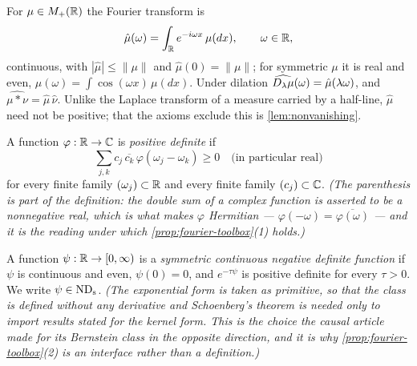 For $\mu \in M_+(\mathbb{R})$ the Fourier transform is
\begin{equation}\label{eq:transform}
  \hat\mu(\omega) = \int_{\mathbb{R}} e^{-i\omega x}\,\mu(dx), \qquad \omega \in \mathbb{R},
\end{equation}
continuous, with $|\hat\mu| \le \|\mu\|$ and $\hat\mu(0) = \|\mu\|$; for symmetric $\mu$ it is
real and even, $\hat\mu(\omega) = \int \cos(\omega x)\,\mu(dx)$. Under dilation
$\widehat{D_{\lambda}\mu}(\omega) = \hat\mu(\lambda\omega)$, and
$\widehat{\mu * \nu} = \hat\mu\,\hat\nu$. Unlike the Laplace transform of a measure carried by
a half-line, $\hat\mu$ need not be positive; that the axioms exclude this is
\ref{lem:nonvanishing}.

\begin{definition}\label{def:positive-definite}
\leanok
{}
A function $\varphi : \mathbb{R} \to \mathbb{C}$ is \emph{positive definite} if
\[
  \sum_{j,k} c_j\,\overline{c_k}\,\varphi(\omega_j - \omega_k) \ge 0
  \quad\text{(in particular real)}
\]
for every finite family $(\omega_j) \subset \mathbb{R}$ and every finite family $(c_j) \subset \mathbb{C}$.
\statusT\quad\emph{(The parenthesis is part of the definition: the double sum of a complex
function is asserted to be a nonnegative real, which is what makes $\varphi$ Hermitian ---
$\varphi(-\omega) = \overline{\varphi(\omega)}$ --- and it is the reading under which
\ref{prop:fourier-toolbox}(1) holds.)}
\end{definition}

\begin{definition}\label{def:symmetric-negdef}
\leanok
{}
A function $\psi : \mathbb{R} \to [0,\infty)$ is a \emph{symmetric continuous negative definite
function} if $\psi$ is continuous and even, $\psi(0) = 0$, and $e^{-\tau\psi}$ is positive
definite for every $\tau > 0$. We write $\psi \in \mathrm{ND}_{\mathrm{s}}$.
\statusT\quad\emph{(The exponential form is taken as primitive, so that the class is defined
without any derivative and Schoenberg's theorem is needed only to import results stated for
the kernel form. This is the choice the causal article made for its Bernstein class in the
opposite direction, and it is why \ref{prop:fourier-toolbox}(2) is an interface rather than a
definition.)}
\end{definition}

